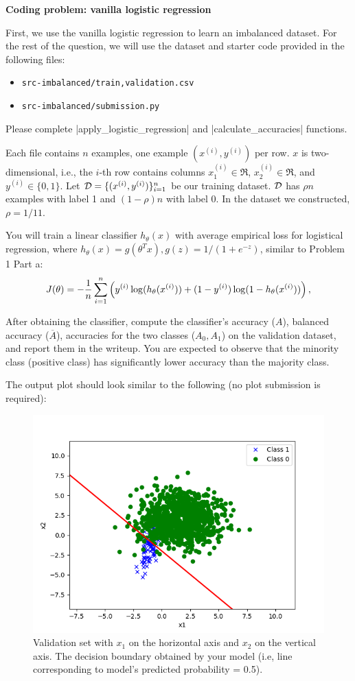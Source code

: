 \item {} \textbf{Coding problem: vanilla logistic regression}

First, we use the vanilla logistic regression to learn an imbalanced dataset. For the rest of the question, we will use the dataset and starter code provided in
the following files:
%
\begin{center}
	\begin{itemize}
		\item	\texttt{src-imbalanced/{train,validation}.csv}
		\item   \texttt{src-imbalanced/submission.py}
	\end{itemize}
\end{center}

Please complete |apply_logistic_regression| and |calculate_accuracies| functions.

Each file contains $n$ examples, one example $(x^{(i)}, y^{(i)})$ per row. $x$ is two-dimensional, i.e., the $i$-th row contains columns $x^{(i)}_1\in\Re$,
$x^{(i)}_2\in\Re$, and $y^{(i)}\in\{0, 1\}$. Let $\mathcal{D}=\{(x^{(i)}, y^{(i)})\}_{i=1}^n$ be our training dataset. $\mathcal{D}$ has $\rho n$ examples with label 1 and $(1-\rho)n$ with label 0. In the dataset we constructed, $\rho=1/11$.

You will train a linear classifier $h_{\theta}(x)$ with average empirical loss for logistical regression, where $h_\theta(x)=g(\theta^T x), g(z)=1/(1+e^{-z})$, similar to Problem 1 Part a:
\begin{align*}
J(\theta) = -\frac{1}{{n}} \sum_{i=1}^{n} \left(y^{(i)}\log(h_{\theta}(x^{(i)}))
+  (1 - y^{(i)})\log(1 - h_{\theta}(x^{(i)}))\right), 
\end{align*}

After obtaining the classifier, compute the classifier's accuracy ($A$), balanced accuracy ($\overline{A}$), accuracies for the two classes ($A_0, A_1$) on the validation dataset, and report them in the writeup. You are expected to observe that the minority class (positive class) has significantly lower accuracy than the majority class. 

The output plot should look similar to the following (no plot submission is required):

\begin{figure}[H]
	\centering
	\vspace{2mm}
	\includegraphics[width=0.5\linewidth]{03-imbalanced/imbalanced_naive_pred.png}
	  \caption{Validation set with $x_1$ on the horizontal axis and $x_2$ on
	  the vertical axis. The decision boundary obtained by your model (i.e, line corresponding to model's predicted probability = 0.5).}
  \end{figure}
